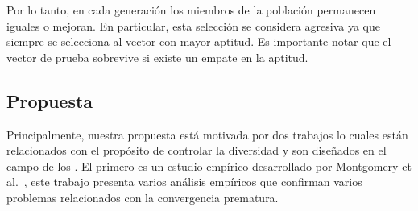 Por lo tanto, en cada generación los miembros de la población permanecen iguales o mejoran.
%
En particular, esta selección se considera agresiva ya que siempre se selecciona al vector con mayor aptitud.
%
Es importante notar que el vector de prueba sobrevive si existe un empate en la aptitud.
%

%


\subsection{Propuesta}

Principalmente, nuestra propuesta está motivada por dos trabajos lo cuales están relacionados con el propósito de controlar la diversidad y son diseñados en el campo de los \EAS{}.
%
El primero es un estudio empírico desarrollado por Montgomery et al.~\cite{montgomery2012simple}, este trabajo presenta varios análisis empíricos que confirman varios problemas relacionados con la convergencia prematura.

